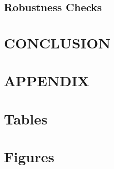\documentclass[12pt]{article}
\begin{document}
\subsection{Robustness Checks}
\label{sec:robustness}


\section{CONCLUSION}
\label{sec:conclusion}


\newpage




\newpage

\appendix

\section*{APPENDIX}

\section{Tables}
\label{app:tables}
\setcounter{table}{0}
\renewcommand{\thetable}{B\arabic{table}}


\section{Figures}
\label{app:figures}
\setcounter{figure}{0}
\renewcommand{\thefigure}{A\arabic{figure}}

\end{document}
